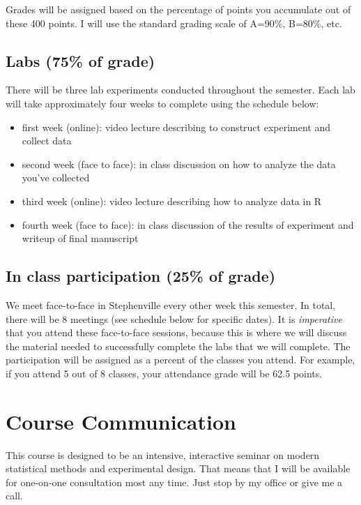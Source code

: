 \documentclass[10pt]{article}
\begin{document}
Grades will be assigned based on the percentage of points you accumulate out of these 400 points.  I will use the standard grading scale of A=90\%, B=80\%, etc.

\subsection*{Labs (75\% of grade)}
\label{sec-5-1}
There will be three lab experiments conducted throughout the semester.  Each lab will take approximately four weeks to complete using the schedule below:

\begin{itemize}
\item first week (online): video lecture describing to construct experiment and collect data
\item second week (face to face): in class discussion on how to analyze the data you've collected
\item third week (online): video lecture describing how to analyze data in R
\item fourth week (face to face): in class discussion of the results of experiment and writeup of final manuscript
\end{itemize}

\subsection*{In class participation (25\% of grade)}
\label{sec-5-2}

We meet face-to-face in Stephenville every other week this semester.  In total, there will be 8 meetings (see schedule below for specific dates).  It is \emph{imperative} that you attend these face-to-face sessions, because this is where we will discuss the material needed to successfully complete the labs that we will complete.  The participation will be assigned as a percent of the classes you attend. For example, if you attend 5 out of 8 classes, your attendance grade will be 62.5 points.

\section*{Course Communication}
\label{sec-6}

This course is designed to be an intensive, interactive seminar on modern statistical methods and experimental design.  That means that I will be available for one-on-one consultation most any time.  Just stop by my office or give me a call.
\end{document}
